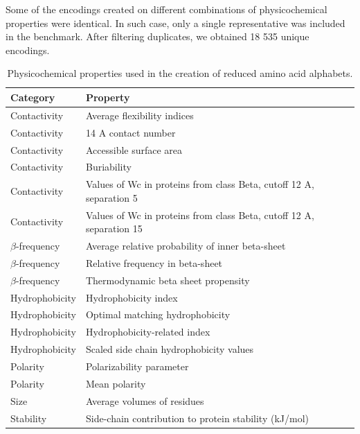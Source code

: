 \documentclass{bioinfo}
\begin{document}
\begin{methods}
Some of the encodings created on different combinations of physicochemical properties were identical. In such case, only a single representative was included in the benchmark. After filtering duplicates, we obtained 18 535 unique encodings.

\begin{table}[bth]
\centering
\begin{tabular}{ll}
  \hline
Category & Property \\ 
  \hline
  Contactivity & Average flexibility indices \citep{bhaskaran_positional_1988} \\ 
  Contactivity & 14 A contact number \citep{nishikawa_radial_1986} \\ 
  Contactivity & Accessible surface area \citep{radzicka_comparing_1988} \\ 
    Contactivity & Buriability \citep{zhou_quantifying_2004} \\ 
  Contactivity & Values of Wc in proteins from class Beta, cutoff 12 A, separation 5 \citep{wozniak_characteristics_2014} \\ 
  Contactivity & Values of Wc in proteins from class Beta, cutoff 12 A, separation 15 \citep{wozniak_characteristics_2014} \\ 
  $\beta$-frequency & Average relative probability of inner beta-sheet \citep{kanehisa_local_1980} \\ 
  $\beta$-frequency & Relative frequency in beta-sheet \citep{prabhakaran_distribution_1990} \\ 
  $\beta$-frequency & Thermodynamic beta sheet propensity \citep{kim_thermodynamic_1993} \\ 
  Hydrophobicity & Hydrophobicity index \citep{argos_structural_1982} \\ 
  Hydrophobicity & Optimal matching hydrophobicity \citep{sweet_correlation_1983} \\ 
  Hydrophobicity & Hydrophobicity-related index \citep{kidera_statistical_1985} \\ 
  Hydrophobicity & Scaled side chain hydrophobicity values \citep{black_development_1991} \\ 
  Polarity & Polarizability parameter \citep{charton_structural_1982} \\ 
  Polarity & Mean polarity \citep{radzicka_comparing_1988} \\ 
  Size & Average volumes of residues \citep{pontius_deviations_1996} \\ 
  Stability & Side-chain contribution to protein stability (kJ/mol) \citep{takano_new_2001} \\ 
   \hline
\end{tabular}
\caption{Physicochemical properties used in the creation of reduced amino acid alphabets.} 
\end{table}


\end{methods}
\end{document}
